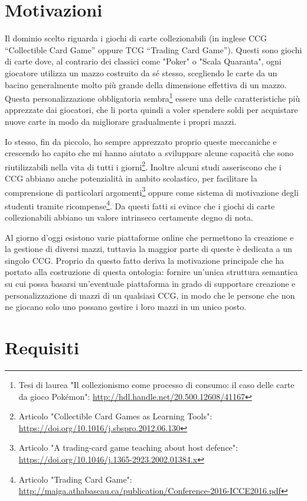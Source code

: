 \documentclass[12pt]{article}
\begin{document}
\newpage
\section{Motivazioni}
Il dominio scelto riguarda i giochi di carte collezionabili (in inglese CCG “Collectible Card Game” oppure TCG “Trading Card Game”). Questi sono giochi di carte dove, al contrario dei classici come "Poker" o "Scala Quaranta", ogni giocatore utilizza un mazzo costruito da sé stesso, scegliendo le carte da un bacino generalmente molto più grande della dimensione effettiva di un mazzo. Questa personalizzazione obbligatoria sembra\footnote{Tesi di laurea "Il collezionismo come processo di consumo: il caso delle carte da gioco Pokémon": \url{http://hdl.handle.net/20.500.12608/41167}} essere una delle caratteristiche più apprezzate dai giocatori, che li porta quindi a voler spendere soldi per acquistare nuove carte in modo da migliorare gradualmente i propri mazzi.

Io stesso, fin da piccolo, ho sempre apprezzato proprio queste meccaniche e crescendo ho capito che mi hanno aiutato a sviluppare alcune capacità che sono riutilizzabili nella vita di tutti i giorni\footnote{Articolo "Collectible Card Games as Learning Tools": \url{https://doi.org/10.1016/j.sbspro.2012.06.130}}.
Inoltre alcuni studi asseriscono che i CCG abbiano anche potenzialità in ambito scolastico, per facilitare la comprensione di particolari argomenti\footnote{Articolo "A trading-card game teaching about host defence": \url{https://doi.org/10.1046/j.1365-2923.2002.01384.x}} oppure come sistema di motivazione degli studenti tramite ricompense\footnote{Articolo "Trading Card Game": \url{http://maiga.athabascau.ca/publication/Conference-2016-ICCE2016.pdf}}. Da questi fatti si evince che i giochi di carte collezionabili abbiano un valore intrinseco certamente degno di nota.

Al giorno d'oggi esistono varie piattaforme online che permettono la creazione e la gestione di diversi mazzi, tuttavia la maggior parte di queste è dedicata a un singolo CCG. Proprio da questo fatto deriva la motivazione principale che ha portato alla costruzione di questa ontologia: fornire un'unica struttura semantica su cui possa basarsi un'eventuale piattaforma in grado di supportare creazione e personalizzazione di mazzi di un qualsiasi CCG, in modo che le persone che non ne giocano solo uno possano gestire i loro mazzi in un unico posto.

\newpage
\section{Requisiti}
\end{document}
